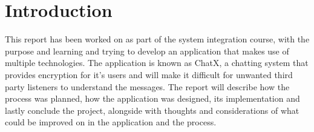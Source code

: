\section{Introduction}

This report has been worked on as part of the system integration course, with the purpose and learning and trying to develop an application that makes use of multiple technologies. The application is known as ChatX, a chatting system that provides encryption for it's users and will make it difficult for unwanted third party listeners to understand the messages. The report will describe how the process was planned, how the application was designed, its implementation and lastly conclude the project, alongside with thoughts and considerations of what could be improved on in the application and the process.